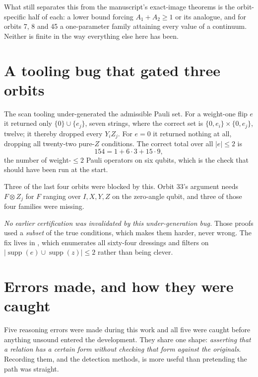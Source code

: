 \documentclass[11pt,a4paper]{article}
\theoremstyle{definition}
\begin{document}
What still separates this from the manuscript's exact-image theorems is the
orbit-specific half of each: a lower bound forcing $A_1+A_2\ge1$ or its
analogue, and for orbits 7, 8 and 45 a one-parameter family attaining every
value of a continuum. Neither is finite in the way everything else here has
been.

\section{A tooling bug that gated three orbits}
\label{sec:bug}

The scan tooling under-generated the admissible Pauli set. For a weight-one flip
$e$ it returned only $\{0\} \cup \{e_j\}$, seven strings, where the correct set
is $\{0, e_i\} \times \{0, e_j\}$, twelve; it thereby dropped every $Y_i Z_j$. For
$e = 0$ it returned nothing at all, dropping all twenty-two pure-$Z$ conditions.
The correct total over all $|e| \le 2$ is
\[
  154 = 1 + 6 \cdot 3 + 15 \cdot 9 ,
\]
the number of weight-$\le 2$ Pauli operators on six qubits, which is the check
that should have been run at the start.

Three of the last four orbits were blocked by this. Orbit 33's argument needs
$F \otimes Z_j$ for $F$ ranging over $I, X, Y, Z$ on the zero-angle qubit, and
three of those four families were missing.

\emph{No earlier certification was invalidated by this under-generation bug.}
Those proofs used a
\emph{subset} of the true conditions, which makes them harder, never wrong. The
fix lives in , which enumerates all sixty-four dressings
and filters on $|\operatorname{supp}(e) \cup \operatorname{supp}(z)| \le 2$
rather than being clever.

\section{Errors made, and how they were caught}
\label{sec:errors}

Five reasoning errors were made during this work and all five were caught before
anything unsound entered the development. They share one shape: \emph{asserting
that a relation has a certain form without checking that form against the
originals}. Recording them, and the detection methods, is more useful than
pretending the path was straight.
\end{document}
